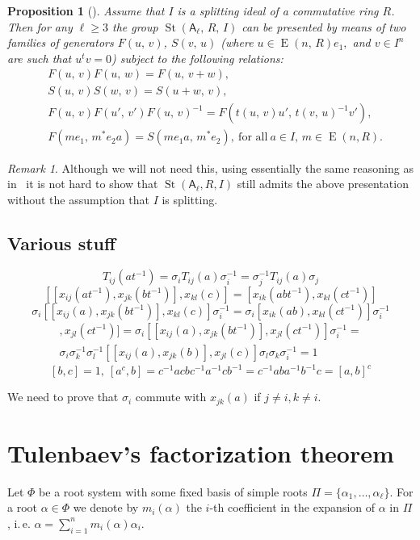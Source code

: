 \documentclass[oneside, 10pt]{amsart}
\DeclareMathOperator{\St}{St}
\DeclareMathOperator{\E}{E}
\newcommand{\rA}{\mathsf{A}}
\numberwithin{equation}{section}
\numberwithin{lemma}{section}
\newtheorem{prop}[lemma]{Proposition}
\theoremstyle{definition}
\theoremstyle{remark}
\newtheorem{rem}[lemma]{Remark}
\begin{document}
\begin{prop}[] \label{prop:rel-presentation}
 Assume that $I$ is a splitting ideal of a commutative ring $R$. 
 Then for any $\ell\geq 3$ the group $\St(\rA_\ell,\,R,\,I)$ can be presented by means of two families of generators $F(u,\,v)$, $S(v,\,u)$
  (where $u\in \E(n,\,R)e_1,$ and $v\in I^n$ are such that $u^tv=0$) subject to the following relations:
\begin{align}
&F(u,\,v)F(u,\,w)=F(u,\,v+w), \label{add4}\\
&S(u,\,v)S(w,\,v)=S(u+w,\,v), \label{add5}\\
&F(u,\,v)F(u',\,v')F(u,\,v)^{-1}=F(t(u,\,v)u',\,t(v,\,u)^{-1} v'), \label{conj3} \\
&F(me_1,\,m^*e_2a)=S(me_1a,\,m^*e_2),\ \text{for all}\ a\in I,\, m \in \E(n, R). \label{coef-move}
\end{align}
\end{prop}
\begin{rem}
Although we will not need this, using essentially the same reasoning as in~\cite[Proposition~8]{S15} it is not hard to show that 
$\St(\rA_\ell, R, I)$ still admits the above presentation without the assumption that $I$ is splitting.
\end{rem}

\subsection{Various stuff}
\[ T_{ij}(at^{-1}) = \sigma_i T_{ij}(a) \sigma_i^{-1} = \sigma_j^{-1} T_{ij}(a) \sigma_j \]
\[ [[x_{ij}(a t^{-1}), x_{jk}(b t^{-1})],  x_{kl}(c)] = [x_{ik}(a b t^{-1}),  x_{kl}(c t^{-1})] \]
\[ \sigma_i [[x_{ij}(a), x_{jk}(b t^{-1})],  x_{kl}(c)] \sigma_i^{-1} =  \sigma_i [x_{ik}(a b),  x_{kl}(c t^{-1})] \sigma_i^{-1} \]
\begin{multline}
[[x_{ij}(at^{-1}), x_{jk}(bt^{-1})], x_{jl}(ct^{-1})] = \sigma_i [[ x_{ij}(a), x_{jk}(bt^{-1})], x_{jl}(ct^{-1})] \sigma_i^{-1} = \\
\sigma_i \sigma_k^{-1} \sigma_l^{-1} [[ x_{ij}(a), x_{jk}(b)], x_{jl}(c)] \sigma_l \sigma_k \sigma_i^{-1} = 1
\end{multline}
\[ [b, c] =1,\ [a^c, b] = c^{-1} a c b c^{-1} a^{-1} c b^{-1} =  c^{-1} a b  a^{-1} b^{-1} c = [a, b]^c \]

We need to prove that $\sigma_i$ commute with $x_{jk}(a)$ if $j\neq i, k \neq i$.


\section{Tulenbaev's factorization theorem}
Let $\Phi$ be a root system with some fixed basis of simple roots $\Pi = \{\alpha_1, \ldots, \alpha_\ell\}$.
For a root $\alpha\in\Phi$ we denote by $m_i(\alpha)$ the $i$-th coefficient in the expansion of $\alpha$ in $\Pi$,
 i.\,e. $\alpha = \sum_{i=1}^n m_i(\alpha) \alpha_i$.
\end{document}
